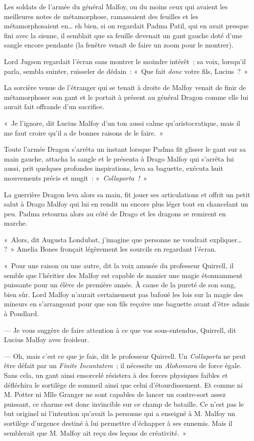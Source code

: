 Les soldats de l'armée du général Malfoy, ou du moins ceux qui avaient les meilleures notes de métamorphose, ramassaient des feuilles et les métamorphosaient en… eh bien, si on regardait Padma Patil, qui en avait presque fini avec la sienne, il semblait que sa feuille devenait un gant gauche doté d'une sangle encore pendante (la fenêtre venait de faire un zoom pour le montrer).

Lord Jugson regardait l'écran sans montrer le moindre intérêt~; sa voix, lorsqu'il parla, sembla suinter, ruisseler de dédain~: «~Que fait \emph{donc} votre fils, Lucius~?~»

La sorcière venue de l'étranger qui se tenait à droite de Malfoy venait de finir de métamorphoser son gant et le portait à présent au général Dragon comme elle lui aurait fait offrande d'un sacrifice.

«~Je l'ignore, dit Lucius Malfoy d'un ton aussi calme qu'aristocratique, mais il me faut croire qu'il a de bonnes raisons de le faire.~»

Toute l'armée Dragon s'arrêta un instant lorsque Padma fit glisser le gant sur sa main gauche, attacha la sangle et le présenta à Drago Malfoy qui s'arrêta lui aussi, prit quelques profondes inspirations, leva sa baguette, exécuta huit mouvements précis et mugit~: «~\emph{Collaporta~!}~»

La guerrière Dragon leva alors sa main, fit jouer ses articulations et offrit un petit salut à Drago Malfoy qui lui en rendit un encore plus léger tout en chancelant un peu.
Padma retourna alors au côté de Drago et les dragons se remirent en marche.

«~Alors, dit Augusta Londubat, j'imagine que personne ne voudrait expliquer…
?~» Amelia Bones fronçait légèrement les sourcils en regardant l'écran.

«~Pour une raison ou une autre, dit la voix amusée du professeur Quirrell, il semble que l'héritier des Malfoy est capable de manier une magie étonnamment puissante pour un élève de première année.
À cause de la pureté de son sang, bien sûr.
Lord Malfoy n'aurait certainement pas bafoué les lois sur la magie des mineurs en s'arrangeant pour que son fils reçoive une baguette avant d'être admis à Poudlard.

--- Je vous suggère de faire attention à ce que vos sous-entendus, Quirrell, dit Lucius Malfoy avec froideur.

--- Oh, mais c'est ce que je fais, dit le professeur Quirrell.
Un \emph{Collaporta} ne peut être défait par un \emph{Finite Incantatem}~; il nécessite un \emph{Alohomora} de force égale.
Sans cela, un gant ainsi ensorcelé résistera à des forces physiques faibles et défléchira le sortilège de sommeil ainsi que celui d'étourdissement.
Et comme ni M. Potter ni Mlle Granger ne sont capables de lancer un contre-sort assez puissant, ce charme est donc invincible sur ce champ de bataille.
Ce n'est pas le but originel ni l'intention qu'avait la personne qui a enseigné à M. Malfoy un sortilège d'urgence destiné à lui permettre d'échapper à ses ennemis.
Mais il semblerait que M. Malfoy ait reçu des leçons de créativité.~»

